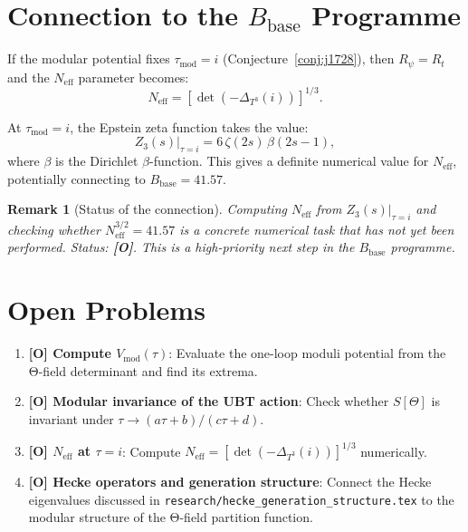 \documentclass[11pt,a4paper]{article}
\newtheorem{remark}{Remark}
\begin{document}
\section{Connection to the \texorpdfstring{$B_{\mathrm{base}}$}{B\_base} Programme}
\label{sec:bbase}

If the modular potential fixes $\tau_{\mathrm{mod}} = i$ (Conjecture~\ref{conj:j1728}),
then $R_\psi = R_t$ and the $N_{\mathrm{eff}}$ parameter becomes:
\begin{equation}
  N_{\mathrm{eff}} = [\det(-\Delta_{T^3}(i))]^{1/3}.
\end{equation}

At $\tau_{\mathrm{mod}} = i$, the Epstein zeta function takes the value:
\begin{equation}
  Z_3(s)|_{\tau=i} = 6\,\zeta(2s)\,\beta(2s-1),
\end{equation}
where $\beta$ is the Dirichlet $\beta$-function.  This gives a definite
numerical value for $N_{\mathrm{eff}}$, potentially connecting to
$B_{\mathrm{base}} = 41.57$.

\begin{remark}[Status of the connection]
  Computing $N_{\mathrm{eff}}$ from $Z_3(s)|_{\tau=i}$ and checking
  whether $N_{\mathrm{eff}}^{3/2} = 41.57$ is a concrete numerical task
  that has not yet been performed.  Status: \textbf{[O]}.
  This is a high-priority next step in the $B_{\mathrm{base}}$ programme.
\end{remark}

\section{Open Problems}
\label{sec:open}

\begin{enumerate}
  \item \textbf{[O] Compute $V_{\mathrm{mod}}(\tau)$}: Evaluate the one-loop
    moduli potential from the Θ-field determinant and find its extrema.

  \item \textbf{[O] Modular invariance of the UBT action}: Check whether
    $S[\Theta]$ is invariant under $\tau \to (a\tau+b)/(c\tau+d)$.

  \item \textbf{[O] $N_{\mathrm{eff}}$ at $\tau = i$}: Compute
    $N_{\mathrm{eff}} = [\det(-\Delta_{T^3}(i))]^{1/3}$ numerically.

  \item \textbf{[O] Hecke operators and generation structure}: Connect
    the Hecke eigenvalues discussed in
    \texttt{research/hecke\_generation\_structure.tex} to the modular
    structure of the Θ-field partition function.
\end{enumerate}
\end{document}
